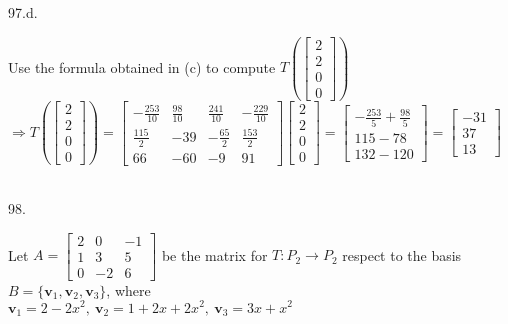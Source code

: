 \documentclass[12pt]{book}
\begin{document}
\begin{CJK}{UTF8}{bsmi}
97.d. \begin{minipage}[t]{\dimexpr\linewidth-2em}
Use the formula obtained in (c) to compute $T\left(\begin{bmatrix}
2\\2\\0\\0
\end{bmatrix}\right)$ \\
$\Rightarrow T\left(\begin{bmatrix}
2\\2\\0\\0
\end{bmatrix}\right)=\begin{bmatrix}
-\frac{253}{10} & \frac{98}{10} & \frac{241}{10} & -\frac{229}{10} \\
\frac{115}{2} & -39 & -\frac{65}{2} & \frac{153}{2} \\
66 & -60 & -9 & 91
\end{bmatrix}\begin{bmatrix}
2\\2\\0\\0
\end{bmatrix}=\begin{bmatrix}
-\frac{253}{5}+\frac{98}{5} \\
115-78 \\
132-120
\end{bmatrix}=\begin{bmatrix}
-31\\37\\13
\end{bmatrix}$
\end{minipage}\\

98. \begin{minipage}[t]{\dimexpr\linewidth-2em}
Let $A=\begin{bmatrix}
2 & 0 & -1 \\
1 & 3 & 5 \\
0 & -2 & 6
\end{bmatrix}$ be the matrix for $T:P_2\rightarrow P_2$ respect to the basis $B=\{\textbf{v}_1, \textbf{v}
_2, \textbf{v}_3\}$, where \\ $\textbf{v}_1=2-2x^2,\ \textbf{v}_2=1+2x+2x^2,\ \textbf{v}_3=3x+x^2$
\end{minipage}\\


\end{CJK}
\end{document}

